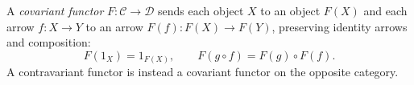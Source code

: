 
A \emph{covariant functor} $F:\mathcal C\to\mathcal D$ sends each object $X$ to an object $F(X)$ and each arrow $f:X\to Y$ to an arrow $F(f):F(X)\to F(Y)$, preserving identity arrows and composition:
\[
F(1_X)=1_{F(X)},\qquad F(g\circ f)=F(g)\circ F(f).
\]
A contravariant functor is instead a covariant functor on the opposite category.
